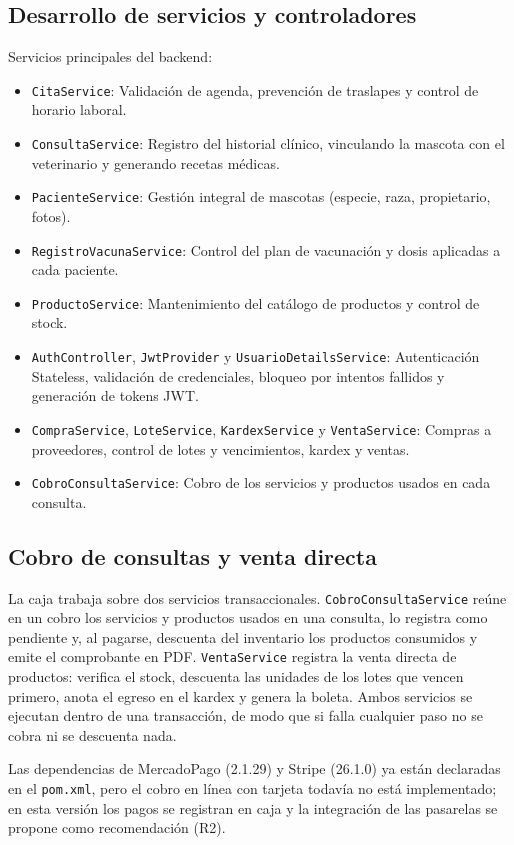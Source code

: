 \documentclass[11pt,a4paper]{report}
\begin{document}
\subsection{Desarrollo de servicios y controladores}
Servicios principales del backend:
\begin{itemize}
\item \texttt{CitaService}: Validación de agenda, prevención de traslapes y control de horario laboral.
\item \texttt{ConsultaService}: Registro del historial clínico, vinculando la mascota con el veterinario y generando recetas médicas.
\item \texttt{PacienteService}: Gestión integral de mascotas (especie, raza, propietario, fotos).
\item \texttt{RegistroVacunaService}: Control del plan de vacunación y dosis aplicadas a cada paciente.
\item \texttt{ProductoService}: Mantenimiento del catálogo de productos y control de stock.
\item \texttt{AuthController}, \texttt{JwtProvider} y \texttt{UsuarioDetailsService}: Autenticación Stateless, validación de credenciales, bloqueo por intentos fallidos y generación de tokens JWT.
\item \texttt{CompraService}, \texttt{LoteService}, \texttt{KardexService} y \texttt{VentaService}: Compras a proveedores, control de lotes y vencimientos, kardex y ventas.
\item \texttt{CobroConsultaService}: Cobro de los servicios y productos usados en cada consulta.
\end{itemize}

\subsection{Cobro de consultas y venta directa}
La caja trabaja sobre dos servicios transaccionales. \texttt{CobroConsultaService} reúne en un cobro los servicios y productos usados en una consulta, lo registra como pendiente y, al pagarse, descuenta del inventario los productos consumidos y emite el comprobante en PDF. \texttt{VentaService} registra la venta directa de productos: verifica el stock, descuenta las unidades de los lotes que vencen primero, anota el egreso en el kardex y genera la boleta. Ambos servicios se ejecutan dentro de una transacción, de modo que si falla cualquier paso no se cobra ni se descuenta nada.

Las dependencias de MercadoPago (2.1.29) y Stripe (26.1.0) ya están declaradas en el \texttt{pom.xml}, pero el cobro en línea con tarjeta todavía no está implementado; en esta versión los pagos se registran en caja y la integración de las pasarelas se propone como recomendación (R2).
\end{document}
